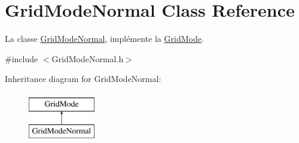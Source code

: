 \hypertarget{classGridModeNormal}{\section{Grid\-Mode\-Normal Class Reference}
\label{classGridModeNormal}
}


La classe \hyperlink{classGridModeNormal}{Grid\-Mode\-Normal}, implémente la \hyperlink{classGridMode}{Grid\-Mode}.  




{\ttfamily \#include $<$Grid\-Mode\-Normal.\-h$>$}

Inheritance diagram for Grid\-Mode\-Normal\-:\begin{figure}[H]
\begin{center}
\leavevmode
\includegraphics[height=2.000000cm]{classGridModeNormal}
\end{center}
\end{figure}

